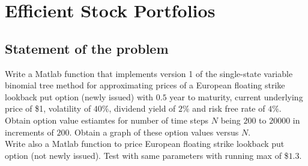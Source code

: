 \section{Efficient Stock Portfolios}
\subsection*{Statement of the problem}
Write a Matlab function that implements version 1 of the single-state variable binomial tree method for approximating prices of a European floating strike lookback put option (newly issued) with $0.5$ year to maturity, current underlying price of \$1, volatility of $40\%$, dividend yield of $2\%$ and risk free rate of $4\%$. Obtain option value estiamtes for number of time steps $N$ being $200$ to $20000$ in increments of $200$. Obtain a graph of these option values versus $N$.\\
Write also a Matlab function to price European floating strike lookback put option (not newly issued). Test with same parameters with running max of \$$1.3$.

